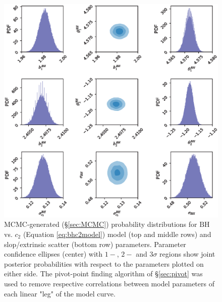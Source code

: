 \begin{figure}
    \centering
    \includegraphics[width=1.0\linewidth]{figures/bhc2_params.eps}
    \caption{MCMC-generated (\S\ref{sec:MCMC}) probability distributions for $\text{BH}$ vs. $c_2$ (Equation \eqref{eq:bhc2model}) model (top and middle rows) and slop/extrinsic scatter (bottom row) parameters. Parameter confidence ellipses (center) with $1-$, $2-$ and $3\sigma$ regions show joint posterior probabilities with respect to the parameters plotted on either side. The pivot-point finding algorithm of \S\ref{sec:pivot} was used to remove respective correlations between model parameters of each linear "leg" of the model curve.}
    \label{fig:bhc2_params}
\end{figure}

